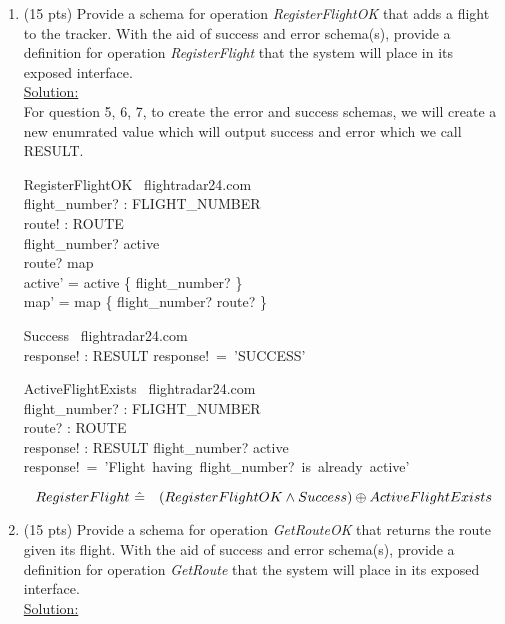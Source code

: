 \documentclass[12pt]{article}
\begin{document}
\begin{enumerate}
\item (15 pts) Provide a schema for operation \emph{RegisterFlightOK} that adds a flight to the
tracker. With the aid of success and error schema(s), provide a definition for operation
\emph{RegisterFlight} that the system will place in its exposed interface. \\
\noindent \underline{Solution:}\\

For question 5, 6, 7, to create the error and success schemas, we will create a new enumrated value which will output success and error which we call RESULT. 

\begin{schema}{RegisterFlightOK}
\Delta \ flightradar24.com\\
flight\_number? : FLIGHT\_NUMBER\\
route! : ROUTE\\
\where
flight\_number? \notin active\\
route? \notin \ran map\\
active' = active \cup \{ flight\_number? \}\\
map' = map \cup \{ flight\_number? \mapsto route? \}\
\end{schema}

\begin{schema}{Success}
\Xi \ flightradar24.com\\
response! : RESULT
\where
response!~=~'SUCCESS'\\
\end{schema}



\begin{schema}{ActiveFlightExists}
\Xi \ flightradar24.com\\
flight\_number? : FLIGHT\_NUMBER\\
route? : ROUTE \\
response! : RESULT
\ST
flight\_number? \in active\\
response!~=~'Flight~having~flight\_number?~is~already~active'
\end{schema}


\[ RegisterFlight~\hat{=}~\\
~~~(RegisterFlightOK \wedge Success) \oplus ActiveFlightExists \]




\item (15 pts) Provide a schema for operation \emph{GetRouteOK} that returns the route given its
flight. With the aid of success and error schema(s), provide a definition for operation
\emph{GetRoute} that the system will place in its exposed interface. \\
\noindent \underline{Solution:}\\


\end{enumerate}
\end{document}
